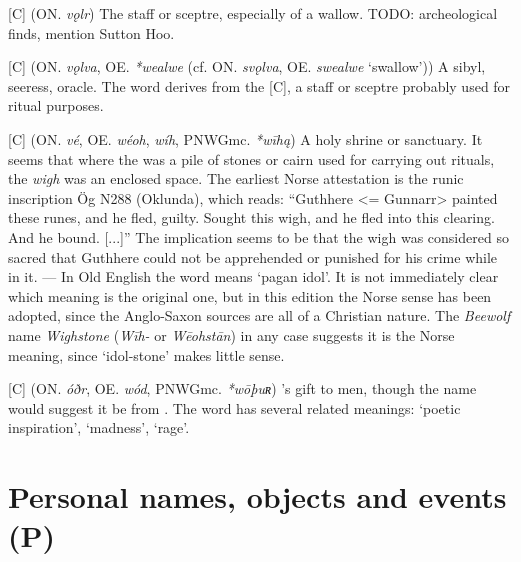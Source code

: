 \begin{itemize}
[C] (ON. \emph{vǫlr})
  The staff or sceptre, especially of a wallow. TODO: archeological finds, mention Sutton Hoo.

[C] (ON. \emph{vǫlva}, OE. \emph{*wealwe} (cf. ON. \emph{svǫlva}, OE. \emph{swealwe} ‘swallow’))
  A sibyl, seeress, oracle. The word derives from the [C], a staff or sceptre probably used for ritual purposes.

[C] (ON. \emph{vé}, OE. \emph{wéoh}, \emph{wíh}, PNWGmc. \emph{*wīhą})
  A holy shrine or sanctuary. It seems that where the  was a pile of stones or cairn used for carrying out rituals, the \emph{wigh} was an enclosed space. The earliest Norse attestation is the runic inscription Ög N288 (Oklunda), which reads: “Guthhere <= Gunnarr> painted these runes, and he fled, guilty. Sought this wigh, and he fled into this clearing. And he bound. [...]” The implication seems to be that the wigh was considered so sacred that Guthhere could not be apprehended or punished for his crime while in it. — In Old English the word means ‘pagan idol’. It is not immediately clear which meaning is the original one, but in this edition the Norse sense has been adopted, since the Anglo-Saxon sources are all of a Christian nature. The \emph{Beewolf} name \emph{Wighstone} (\emph{Wīh-} or \emph{Wēohstān}) in any case suggests it is the Norse meaning, since ‘idol-stone’ makes little sense.

[C] (ON. \emph{óðr}, OE. \emph{wód}, PNWGmc. \emph{*wōþuʀ})
  's gift to men, though the name would suggest it be from . The word has several related meanings: ‘poetic inspiration’, ‘madness’, ‘rage’.

\end{itemize}


\section{Personal names, objects and events (P)}

